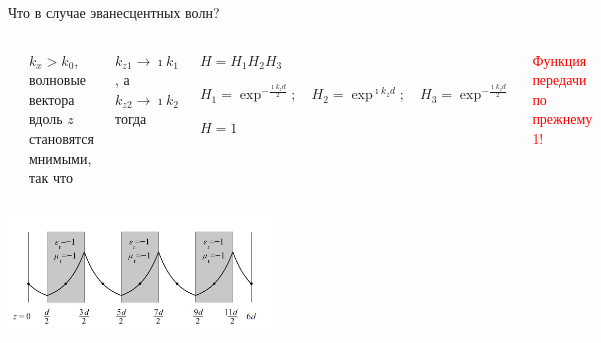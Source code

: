 \documentclass[9pt, compress, xcolor=table]{beamer}
\begin{document}
\begin{frame}{Что в случае эванесцентных волн?}

\begin{columns}[c]

\column{6cm}

\begin{center}
\includegraphics[width=4cm]{neg_ref_40}
\end{center}

\column{6cm}  $k_x>k_0$, волновые вектора вдоль $z$ становятся мнимыми, так что

$k_{z1}\rightarrow \imath k_1$, а $k_{z2}\rightarrow \imath k_2$ тогда

\begin{center}
$H=H_1H_2H_3$

$H_1= \exp^{-\frac{\imath k_z d}{2}};\quad H_2= \exp^{\imath k_z d};\quad H_3= \exp^{-\frac{\imath
k_z d}{2}}$

$H=1$
\end{center}
\textcolor{red}{Функция передачи по прежнему 1!} 
\end{columns}

\begin{center}
\includegraphics[width=7cm]{neg_ref_40b}
\end{center}

\end{frame}
\end{document}
